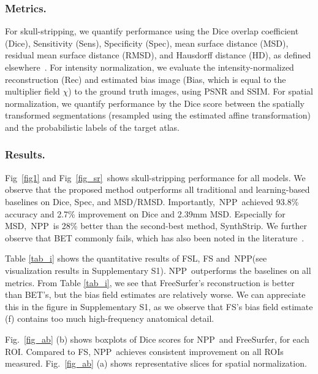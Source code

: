 \documentclass[runningheads]{llncs}
\newcommand{\modelname}{NPP}
\begin{document}
\subsubsection{Metrics.}
For skull-stripping, we quantify performance using the Dice overlap coefficient (Dice), Sensitivity (Sens), Specificity (Spec), mean surface distance (MSD), residual mean surface distance (RMSD), and Hausdorff distance (HD), as defined elsewhere~\cite{jadon2020survey}.
For intensity normalization, we evaluate the intensity-normalized reconstruction (Rec) and estimated bias image (Bias, which is equal to the multiplier field $\chi$) to the ground truth images, using PSNR and SSIM. 
For spatial normalization, we quantify performance by the Dice score between the spatially transformed segmentations (resampled using the estimated affine transformation) and the probabilistic labels of the target atlas.

\subsubsection{Results.}
Fig~\ref{fig1} and Fig~\ref{fig_sr}~shows skull-stripping performance for all models. 
We observe that the proposed method outperforms all traditional and learning-based baselines on Dice, Spec, and MSD/RMSD. 
Importantly,~\modelname~achieved 93.8\% accuracy and 2.7\% improvement on Dice and 2.39mm MSD.
Especially for MSD,~\modelname~is 28\% better than the second-best method, SynthStrip. 
We further observe that BET commonly fails, which has also been noted in the literature~\cite{ezhilarasan2021automatic}.

Table \ref{tab_i} shows the quantitative results of FSL, FS and~\modelname (see visualization results in Supplementary S1). 
\modelname~outperforms the baselines on all metrics. 
From Table \ref{tab_i}, we see that FreeSurfer's reconstruction is better than BET's, but the bias field estimates are relatively worse. 
We can appreciate this in the figure in Supplementary S1, as we observe that FS's bias field estimate (f) contains too much high-frequency anatomical detail.

Fig.~\ref{fig_ab} (b) shows boxplots of Dice scores for \modelname~and FreeSurfer, for each ROI. Compared to FS,  
\modelname~achieves consistent improvement on all ROIs measured. Fig.~\ref{fig_ab} (a) shows representative slices for spatial normalization.


 
\end{document}
